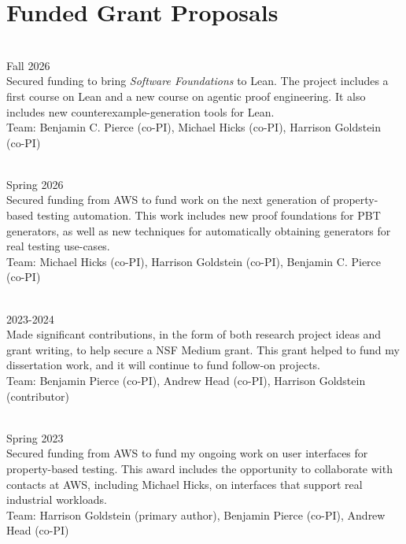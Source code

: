 \documentclass[a4paper]{article}
\newcommand{\semibf}{\fontseries{semibold}\selectfont}
\begin{document}
\section*{Funded Grant Proposals}
 \\
Fall 2026 \\
Secured funding to bring \emph{Software Foundations} to Lean. The project
includes a first course on Lean and a new course on agentic proof engineering.
It also includes new counterexample-generation tools for Lean. \\
Team: Benjamin C. Pierce (co-PI), Michael Hicks (co-PI), {\semibf Harrison
Goldstein} (co-PI)

\bigskip
{} \\
Spring 2026 \\
Secured funding from AWS to fund work on the next generation of property-based
testing automation. This work includes new proof foundations for PBT generators,
as well as new techniques for automatically obtaining generators for real
testing use-cases. \\
Team: Michael Hicks (co-PI), {\semibf Harrison Goldstein} (co-PI), Benjamin C.
Pierce (co-PI)

\bigskip
{} \\
2023-2024 \\
Made significant contributions, in the form of both research project ideas and
grant writing, to help secure a NSF Medium grant. This grant helped to fund my
dissertation work, and it will continue to fund follow-on projects. \\
Team: Benjamin Pierce (co-PI), Andrew Head (co-PI), {\semibf Harrison Goldstein}
(contributor)

\newpage
\bigskip
{} \\
Spring 2023 \\
Secured funding from AWS to fund my ongoing work on user interfaces for
property-based testing. This award includes the opportunity to collaborate with
contacts at AWS, including Michael Hicks, on interfaces that support real
industrial workloads. \\
Team: {\semibf Harrison Goldstein} (primary author), Benjamin Pierce (co-PI),
Andrew Head (co-PI)
\end{document}
